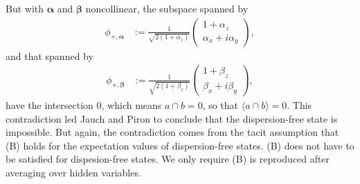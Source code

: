 \documentclass[12pt]{article}
\begin{document}
But with $\bm{\alpha}$ and $\bm{\beta}$ noncollinear, the subspace spanned by 
\begin{align*}
    \phi_{+,\bm{\alpha}}
    &:= \frac{1}{\sqrt{2 (1+\alpha_z)}}
    \begin{pmatrix}
      1 +\alpha_z \\
      \alpha_x+i\alpha_y
    \end{pmatrix},
\end{align*}
and that spanned by 
\begin{align*}
    \phi_{+,\bm{\beta}}
    &:= \frac{1}{\sqrt{2 (1+\beta_z)}}
    \begin{pmatrix}
      1 +\beta_z \\
      \beta_x+i\beta_y
    \end{pmatrix},
\end{align*}
have the intersection $0$, which means $a \cap b = 0$, so that $\langle a \cap b \rangle = 0$. This contradiction led Jauch and Piron to conclude that the dispersion-free state is impossible. But again, the contradiction comes from the tacit assumption that (B) holds for the expectation values of dispersion-free states. (B) does not have to be satisfied for dispesion-free states. We only require (B) is reproduced after averaging over hidden variables.



\end{document}
